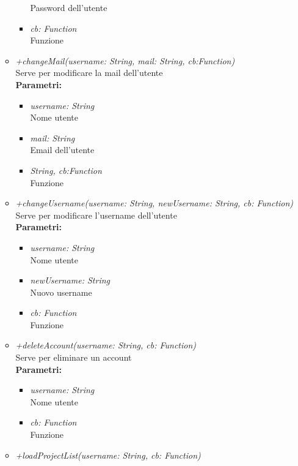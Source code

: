 \begin{itemize}
\begin{itemize}
\begin{itemize}
    			Password dell'utente
    			\item \emph{cb: Function}\\
    			Funzione
    		\end{itemize}
    		\item \emph{+changeMail(username: String, mail: String, cb:Function)}\\
    		Serve per modificare la mail dell'utente\\
    		\textbf{Parametri:}
    		\begin{itemize}
    			\item \emph{username: String}\\
    			Nome utente
    			\item \emph{mail: String}\\
    			Email dell'utente
    			\item \emph{String, cb:Function}\\
    			Funzione
    		\end{itemize}
    		\item \emph{+changeUsername(username: String, newUsername: String, cb: Function)}\\
    		Serve per modificare l'username dell'utente\\
    		\textbf{Parametri:}
    		\begin{itemize}
    			\item \emph{username: String}\\
    			Nome utente
    			\item \emph{newUsername: String}\\
    			Nuovo username
    			\item \emph{cb: Function}\\
    			Funzione
    		\end{itemize}
    		\item \emph{+deleteAccount(username: String, cb: Function)}\\
    		Serve per eliminare un account\\
    		\textbf{Parametri:}
    		\begin{itemize}
    			\item \emph{username: String}\\
    			Nome utente
    			\item \emph{cb: Function}\\
    			Funzione
    		\end{itemize}
    		\item \emph{+loadProjectList(username: String, cb: Function)}\\

\end{itemize}
\end{itemize}
